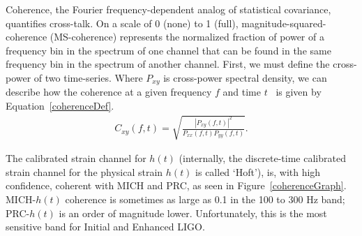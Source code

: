 	 Coherence, the Fourier frequency-dependent analog of statistical covariance, quantifies cross-talk. On a scale of 0 (none) to 1 (full), magnitude-squared-coherence (MS-coherence) represents the normalized fraction of power of a frequency bin in the spectrum of one channel that can be found in the same frequency bin in the spectrum of another channel. First, we must define the cross-power of two time-series. Where $P_{xy}$ is cross-power spectral density, 
%
% 
%
we can describe how the coherence at a given frequency $f$ and time $t$~\cite{Boashash1990} is given by Equation~\ref{coherenceDef}. 
\begin{eqnarray}
C_{xy}(f, t) = \sqrt{\frac{\left| P_{xy}(f, t) \right|^2}{P_{xx}(f, t) P_{yy} (f, t)}}\label{coherenceDef}.
\end{eqnarray}



The calibrated strain channel for $h(t)$ (internally, the discrete-time calibrated strain channel for the physical strain $h(t)$ is called `Hoft'), is, with high confidence, coherent with MICH and PRC, as seen in Figure~\ref{coherenceGraph}. MICH-$h(t)$ coherence is sometimes as large as 0.1 in the 100 to 300 Hz band; PRC-$h(t)$ is an order of magnitude lower. Unfortunately, this is the most sensitive band for Initial and Enhanced LIGO. 


